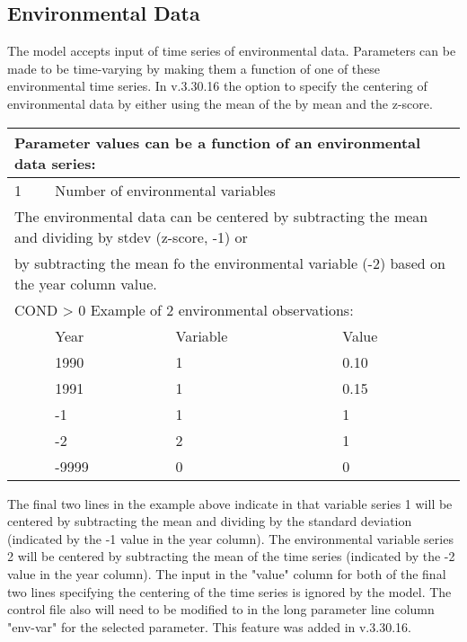 \hypertarget{env-dat}{}
\subsection{Environmental Data}
The model accepts input of time series of environmental data.  Parameters can be made to be time-varying by making them a function of one of these environmental time series. In v.3.30.16 the option to specify the centering of environmental data by either using the mean of the by mean and the z-score. 

\begin{center}
	\begin{tabular}{p{1cm} p{3cm} p{3cm} p{7.5cm}}
		\multicolumn{4}{l}{Parameter values can be a function of an environmental data series: }\\
		\hline
		1 & \multicolumn{3}{l}{Number of environmental variables}\Tstrut\Bstrut\\
		\multicolumn{4}{l}{ The environmental data can be centered by subtracting the mean and dividing by stdev (z-score, -1) or }\\
		\multicolumn{4}{l}{ by subtracting the mean fo the environmental variable (-2) based on the year column value. }\\
		\hline
		\multicolumn{4}{l}{COND > 0  Example of 2 environmental observations:} \Tstrut\\
		  & Year & Variable & Value \Bstrut\\
		\hline
		  & 1990 & 1 & 0.10 \Tstrut\\
		  & 1991 & 1 & 0.15 \\
		  & -1   & 1 & 1 \\
		  & -2   & 2 & 1 \\
		  & -9999 & 0 & 0 \Bstrut\\
		\hline
	\end{tabular}
\end{center}

The final two lines in the example above indicate in that variable series 1 will be centered by subtracting the mean and dividing by the standard deviation (indicated by the -1 value in the year column). The environmental variable series 2 will be centered by subtracting the mean of the time series (indicated by the -2 value in the year column).  The input in the "value" column for both of the final two lines specifying the centering of the time series is ignored by the model. The control file also will need to be modified to in the long parameter line column "env-var" for the selected parameter. This feature was added in v.3.30.16.


